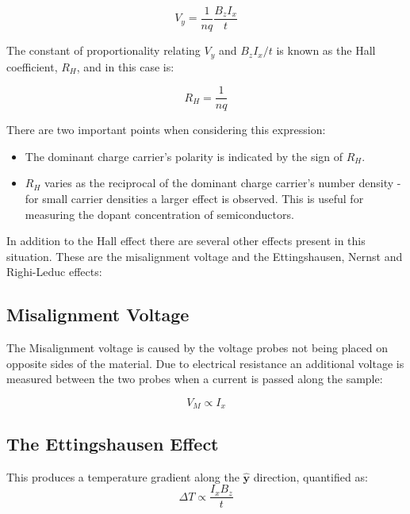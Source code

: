 \documentclass[a4paper]{article}
\newcommand{\supercite}[1]{\textsuperscript{\cite{#1}}}
\begin{document}
		\begin{equation} \label{eq:hallEffect}
			V_y = \frac{1}{nq}\frac{B_zI_x}{t}
		\end{equation}
		
		\noindent The constant of proportionality relating $V_y$ and $B_zI_x/t$ is known as the Hall coefficient, $R_H$, and in this case is:
		
		\begin{equation} \label{eq:hallCoefficient}
			R_H = \frac{1}{nq}
		\end{equation}
		
		\noindent There are two important points when considering this expression:
		
		\begin{itemize}
			\item The dominant charge carrier's polarity is indicated by the sign of $R_H$.
			\item $R_H$ varies as the reciprocal of the dominant charge carrier's number density - for small carrier densities a larger effect is observed. This is useful for measuring the dopant concentration of semiconductors.
		\end{itemize}
		
		In addition to the Hall effect there are several other effects present in this situation. These are the misalignment voltage and the Ettingshausen, Nernst and Righi-Leduc effects:
		
		\subsection{Misalignment Voltage}
			The Misalignment voltage is caused by the voltage probes not being placed on opposite sides of the material. Due to electrical resistance an additional voltage is measured between the two probes when a current is passed along the sample:
			
			\begin{equation}
				V_M \propto I_x
			\end{equation}
		
		\subsection{The Ettingshausen Effect}
			This produces a temperature gradient along the $\hat{\mathbf{y}}$ direction, quantified as\supercite{lindbergHall}:
			\begin{equation}
				\Delta T \propto \frac{I_xB_z}{t}
			\end{equation}
			
\end{document}
